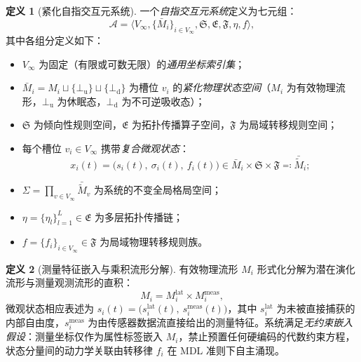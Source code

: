 \documentclass[11pt,a4paper]{article}
\numberwithin{equation}{section}
\theoremstyle{definition}
\newtheorem{definition}{定义}[section]
\theoremstyle{remark}
\begin{document}
	\begin{definition}[紧化自指交互元系统]\label{def:iesystem}
		一个\emph{自指交互元系统}定义为七元组：
		\begin{equation}
			\mathcal{A}=\langle V_\infty,\{\bar{M}_i\}_{i\in V_\infty},\mathfrak{S},\mathfrak{E},\mathfrak{F},\eta,f\rangle,
			\label{eq:iesystem}
		\end{equation}
		其中各组分定义如下：
		\begin{itemize}[leftmargin=2em]
			\item $V_\infty$ 为固定（有限或可数无限）的\emph{通用坐标索引集}；
			\item $\bar{M}_i = M_i \sqcup \{\bot_{\mathrm{u}}\} \sqcup \{\bot_{\mathrm{d}}\}$ 为槽位 $v_i$ 的\emph{紧化物理状态空间}（$M_i$ 为有效物理流形，$\bot_{\mathrm{u}}$ 为休眠态，$\bot_{\mathrm{d}}$ 为不可逆吸收态）；
			\item $\mathfrak{S}$ 为倾向性规则空间，$\mathfrak{E}$ 为拓扑传播算子空间，$\mathfrak{F}$ 为局域转移规则空间；
			\item 每个槽位 $v_i\in V_\infty$ 携带\emph{复合微观状态}：
			\begin{equation}
				x_i(t) = \bigl(s_i(t),\ \sigma_i(t),\ f_i(t)\bigr) \in \bar{M}_i \times \mathfrak{S} \times \mathfrak{F} \eqqcolon \bar{\widetilde{M}}_i;
				\label{eq:composite-state}
			\end{equation}
			\item $\Sigma = \prod_{v\in V_\infty} \bar{\widetilde{M}}_v$ 为系统的不变全局格局空间；
			\item $\eta=\{\eta_l\}_{l=1}^L \in \mathfrak{E}$ 为多层拓扑传播链；
			\item $f=\{f_i\}_{i\in V_\infty} \in \mathfrak{F}$ 为局域物理转移规则族。
		\end{itemize}
	\end{definition}

	\begin{definition}[测量特征嵌入与乘积流形分解]\label{def:state-decomposition}
		有效物理流形 $M_i$ 形式化分解为潜在演化流形与测量观测流形的直积：
		\begin{equation}
			M_i = M_i^{\mathrm{lat}} \times M_i^{\mathrm{meas}},
			\label{eq:state-decomposition}
		\end{equation}
		微观状态相应表述为 $s_i(t) = \bigl(s_i^{\mathrm{lat}}(t),\ s_i^{\mathrm{meas}}(t)\bigr)$，其中 $s_i^{\mathrm{lat}}$ 为未被直接捕获的内部自由度，$s_i^{\mathrm{meas}}$ 为由传感器数据流直接给出的测量特征。系统满足\emph{无约束嵌入假设}：测量坐标仅作为属性标签嵌入 $M_i$，禁止预置任何硬编码的代数约束方程，状态分量间的动力学关联由转移律 $f_i$ 在 MDL 准则下自主涌现。
	\end{definition}
	
\end{document}
